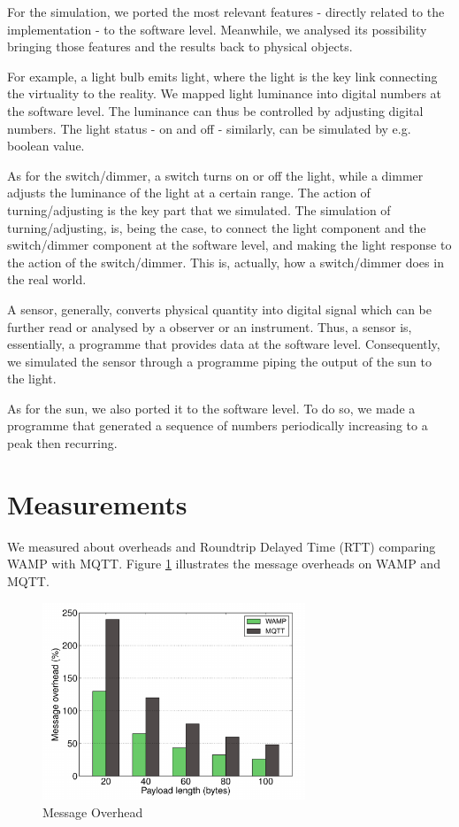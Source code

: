 For the simulation, we ported the most relevant features - directly related to the implementation - to the software level. Meanwhile, we analysed its possibility bringing those features and the results back to physical objects. 

For example, a light bulb emits light, where the light is the key link connecting the virtuality to the reality. We mapped light luminance into digital numbers at the software level. The luminance can thus be controlled by adjusting digital numbers. The light status - on and off - similarly, can be simulated by e.g. boolean value. 

As for the switch/dimmer, a switch turns on or off the light, while a dimmer adjusts the luminance of the light at a certain range. The action of turning/adjusting is the key part that we simulated. The simulation of turning/adjusting, is, being the case, to connect the light component and the switch/dimmer component at the software level, and making the light response to the action of the switch/dimmer. This is, actually, how a switch/dimmer does in the real world.

A sensor, generally, converts physical quantity into digital signal which can be further read or analysed by a observer or an instrument. Thus, a sensor is, essentially, a programme that provides data at the software level. Consequently, we simulated the sensor through a programme piping the output of the sun to the light.

As for the sun, we also ported it to the software level. To do so, we made a programme that generated a sequence of numbers periodically increasing to a peak then recurring.

\section{Measurements}
We measured about overheads and Roundtrip Delayed Time (RTT) comparing WAMP with MQTT. Figure \ref{fig:overhead} illustrates the message overheads on WAMP and MQTT.

\begin{figure}[t]
  \begin{center}
    \includegraphics[width=0.7\textwidth]{images/overhead.pdf}
    \caption{Message Overhead}
    \label{fig:overhead}
  \end{center}
\end{figure}

